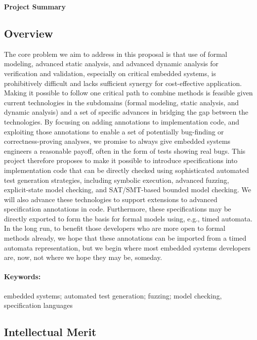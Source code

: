 \documentclass[11pt]{article}
\begin{document}

\begin{center}
  \large\bfseries
  Project Summary
\end{center}

\subsection*{Overview}

The core problem we aim to address in this proposal is that use of formal modeling, advanced static analysis, and advanced dynamic analysis for verification and validation, especially on critical embedded systems, is prohibitively difficult and lacks sufficient synergy for cost-effective application. Making it possible to follow one critical path to combine methods is feasible given current technologies in the subdomains (formal modeling, static analysis, and dynamic analysis) and a set of specific advances in bridging the gap between the technologies. By focusing on adding annotations to implementation code, and exploiting those annotations to enable a set of potentially bug-finding or correctness-proving analyses, we promise to always give embedded systems engineers a reasonable payoff, often in the form of tests showing real bugs. This project therefore proposes to make it possible to introduce specifications into implementation code that can be directly checked using sophisticated automated test generation strategies, including symbolic execution, advanced fuzzing, explicit-state model checking, and SAT/SMT-based bounded model checking. We will also advance these technologies 
to support extensions to advanced specification annotations in code. Furthermore, these specifications may be directly exported to form the basis for formal models using, e.g., timed automata. In the long run, to benefit those developers who are more open to formal methods already, we hope that these annotations can be imported from a timed automata representation, but we begin where most embedded systems developers are, now, not where we hope they may be, someday.

\paragraph{Keywords:} embedded systems; automated test generation; fuzzing; model checking, specification languages

\subsection*{Intellectual Merit}
\end{document}
